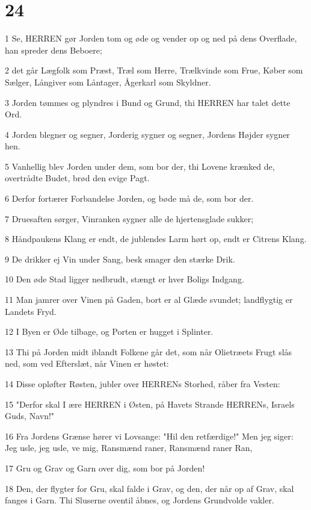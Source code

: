 \chapter{24}

\par 1 Se, HERREN gør Jorden tom og øde og vender op og ned på dens Overflade, han spreder dens Beboere;
\par 2 det går Lægfolk som Præst, Træl som Herre, Trælkvinde som Frue, Køber som Sælger, Långiver som Låntager, Ågerkarl som Skyldner.
\par 3 Jorden tømmes og plyndres i Bund og Grund, thi HERREN har talet dette Ord.
\par 4 Jorden blegner og segner, Jorderig sygner og segner, Jordens Højder sygner hen.
\par 5 Vanhellig blev Jorden under dem, som bor der, thi Lovene krænked de, overtrådte Budet, brød den evige Pagt.
\par 6 Derfor fortærer Forbandelse Jorden, og bøde må de, som bor der.
\par 7 Druesaften sørger, Vinranken sygner alle de hjertensglade sukker;
\par 8 Håndpaukens Klang er endt, de jublendes Larm hørt op, endt er Citrens Klang.
\par 9 De drikker ej Vin under Sang, besk smager den stærke Drik.
\par 10 Den øde Stad ligger nedbrudt, stængt er hver Boligs Indgang.
\par 11 Man jamrer over Vinen på Gaden, bort er al Glæde svundet; landflygtig er Landets Fryd.
\par 12 I Byen er Øde tilbage, og Porten er hugget i Splinter.
\par 13 Thi på Jorden midt iblandt Folkene går det, som når Olietræets Frugt slås ned, som ved Efterslæt, når Vinen er høstet:
\par 14 Disse opløfter Røsten, jubler over HERRENs Storhed, råber fra Vesten:
\par 15 "Derfor skal I ære HERREN i Østen, på Havets Strande HERRENs, Israels Guds, Navn!"
\par 16 Fra Jordens Grænse hører vi Lovsange: "Hil den retfærdige!" Men jeg siger: Jeg usle, jeg usle, ve mig, Ransmænd raner, Ransmænd raner Ran,
\par 17 Gru og Grav og Garn over dig, som bor på Jorden!
\par 18 Den, der flygter for Gru, skal falde i Grav, og den, der når op af Grav, skal fanges i Garn. Thi Sluserne oventil åbnes, og Jordens Grundvolde vakler.
